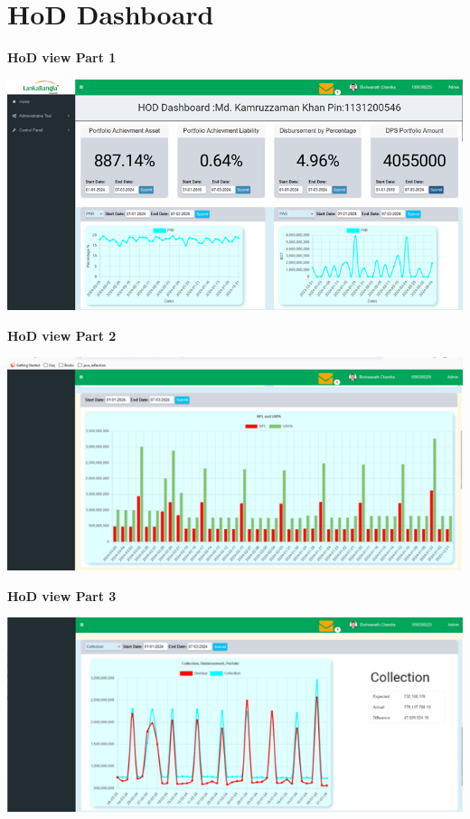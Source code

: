 \documentclass{article}
\begin{document}
\section{HoD Dashboard}

\textbf{HoD view Part 1}\\
\begin{center}
\includegraphics[width=1.0\textwidth]{image/hod_1.png}
\end{center}
\vspace{\baselineskip}
\vspace{\baselineskip}

\textbf{HoD view Part 2}\\
\begin{center}
\includegraphics[width=1.0\textwidth]{image/hod_2.png}
\end{center}

\textbf{HoD view Part 3}\\
\begin{center}
\includegraphics[width=1.00\textwidth]{image/hod_3.png}
\end{center}
\end{document}

